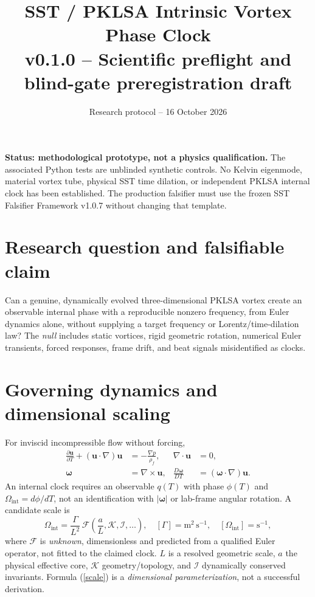\documentclass[11pt,a4paper]{article}
\title{SST / PKLSA Intrinsic Vortex Phase Clock\\\large v0.1.0 -- Scientific preflight and blind-gate preregistration draft}
\author{Research protocol -- 16 October 2026}
\date{}
\newcommand{\rhoF}{\rho_{\!f}}
\newcommand{\Omint}{\Omega_{\mathrm{int}}}
\begin{document}
\maketitle
\noindent\textbf{Status: methodological prototype, not a physics qualification.} The associated Python tests are unblinded synthetic controls. No Kelvin eigenmode, material vortex tube, physical SST time dilation, or independent PKLSA internal clock has been established. The production falsifier must use the frozen SST Falsifier Framework v1.0.7 without changing that template.

\section{Research question and falsifiable claim}
Can a genuine, dynamically evolved three-dimensional PKLSA vortex create an observable internal phase with a reproducible nonzero frequency, from Euler dynamics alone, without supplying a target frequency or Lorentz/time-dilation law? The \emph{null} includes static vortices, rigid geometric rotation, numerical Euler transients, forced responses, frame drift, and beat signals misidentified as clocks.

\section{Governing dynamics and dimensional scaling}
For inviscid incompressible flow without forcing,
\begin{align}
\frac{\partial\mathbf u}{\partial T}+(\mathbf u\cdot\nabla)\mathbf u&=-\frac{\nabla p}{\rhoF},& \nabla\cdot\mathbf u&=0,\\
\boldsymbol\omega&=\nabla\times\mathbf u,&\frac{D\boldsymbol\omega}{DT}&=(\boldsymbol\omega\cdot\nabla)\mathbf u.\label{euler}
\end{align}
An internal clock requires an observable $q(T)$ with phase $\phi(T)$ and $\Omint=d\phi/dT$, not an identification with $|\boldsymbol\omega|$ or lab-frame angular rotation. A candidate scale is
\begin{equation}
 \Omint=\frac{\Gamma}{L^2}\,\mathcal{F}\!\left(\frac{a}{L},\mathcal K,\mathcal I,\ldots\right),\quad [\Gamma]=\mathrm{m^2\,s^{-1}},\quad [\Omint]=\mathrm{s^{-1}},\label{scale}
\end{equation}
where $\mathcal F$ is \emph{unknown}, dimensionless and predicted from a qualified Euler operator, not fitted to the claimed clock. $L$ is a resolved geometric scale, $a$ the physical effective core, $\mathcal K$ geometry/topology, and $\mathcal I$ dynamically conserved invariants. Formula (\ref{scale}) is a \emph{dimensional parameterization}, not a successful derivation.
\end{document}
